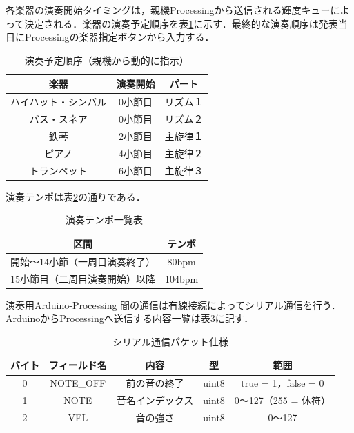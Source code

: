 \documentclass[lualatex,book,paper=a4paper,jafontsize=11.5pt,jafontscale=1.05,oneside]{jlreq}
\begin{document}
各楽器の演奏開始タイミングは，親機Processingから送信される輝度キューによって決定される．楽器の演奏予定順序を表\ref{offset01}に示す．最終的な演奏順序は発表当日にProcessingの楽器指定ボタンから入力する．
\begin{table}[H]
  \centering
  \caption{演奏予定順序（親機から動的に指示）}
  \label{offset01}
  \begin{tabular}{|c|c|c|}
\hline
楽器 & 演奏開始 & パート \\\hline \hline
ハイハット・シンバル & 0小節目 & リズム１ \\ \hline
バス・スネア & 0小節目 & リズム２ \\ \hline
鉄琴 & 2小節目 & 主旋律１ \\ \hline
ピアノ & 4小節目 & 主旋律２ \\ \hline
トランペット & 6小節目 & 主旋律３ \\ \hline
  \end{tabular}  
\end{table}
\FloatBarrier

演奏テンポは表\ref{テンポ}の通りである．\\
\begin{table}[h]
  \centering
  \caption{演奏テンポ一覧表}
  \label{テンポ}
  \begin{tabular}{|c|c|}
\hline
区間 & テンポ  \\\hline \hline
開始〜14小節（一周目演奏終了） & 80bpm \\ \hline
15小節目（二周目演奏開始）以降 & 104bpm  \\ \hline


  \end{tabular}  
\end{table}
\FloatBarrier

演奏用Arduino-Processing 間の通信は有線接続によってシリアル通信を行う．ArduinoからProcessingへ送信する内容一覧は表\ref{serial}に記す．

\begin{table}[h]
  \centering
  \caption{シリアル通信パケット仕様}
  \label{serial}
  \begin{tabular}{|c|c|c|c|c|}
\hline
バイト & フィールド名& 内容& 型 & 範囲  \\\hline \hline
0&NOTE\_OFF&前の音の終了&uint8&true = 1，false = 0 \\ \hline
1 & NOTE & 音名インデックス & uint8 &   0〜127（255 = 休符）\\ \hline
2 & VEL & 音の強さ & uint8 &   0〜127\\ \hline
  \end{tabular}  
\end{table}
\FloatBarrier
\end{document}
